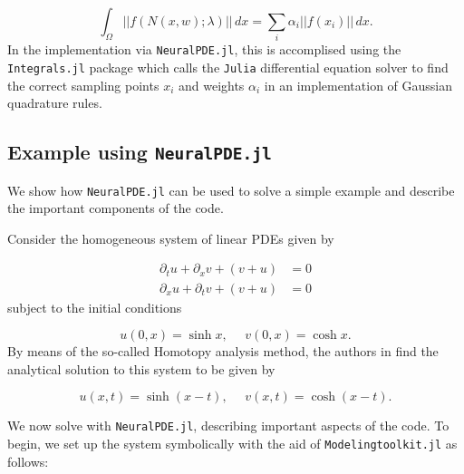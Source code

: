 \documentclass{CUP-JNL-DTM}%
\theoremstyle{definition}
\numberwithin{equation}{section}
\newcommand{\Julia}{\texttt{Julia} }
\begin{document}
\begin{equation}
	\int_{\Omega} ||f(N(x,w); \lambda)||\,dx = \sum_i \alpha_i ||f(x_i)||\,dx.
\end{equation}
In the implementation via \texttt{NeuralPDE.jl}, this is accomplised using the \texttt{Integrals.jl} package which calls the \Julia differential equation solver \cite{rackauckasDifferentialEquationsJlPerformant2017} to find the correct sampling points $x_i$ and weights $\alpha_i$ in an implementation of Gaussian quadrature rules. 

\subsection{Example using \texttt{NeuralPDE.jl}}

We show how \texttt{NeuralPDE.jl} can be used to solve a simple example and describe the important components of the code. 

Consider the homogeneous system of linear PDEs given by

\begin{equation}
\begin{split}
	\partial_t u + \partial_x v + (v + u) & = 0 \\
	\partial_x u + \partial_t v + (v + u) & = 0
\end{split}
\end{equation}
subject to the initial conditions 

\begin{equation}
	u(0,x) = \sinh x, \,\,\,\,\,\,\,\, v(0,x) = \cosh x. 
\end{equation}    
By means of the so-called Homotopy analysis method, the authors in \cite{samibatainehApproximateAnalyticalSolutions2008} find the analytical solution to this system to be given by 

\begin{equation}
	u(x,t) = \sinh(x - t), \,\,\,\,\,\,\,\, v(x,t) = \cosh(x - t). 
\end{equation}

We now solve with \texttt{NeuralPDE.jl}, describing important aspects of the code. To begin, we set up the system symbolically with the aid of \texttt{Modelingtoolkit.jl} as follows:
\end{document}
